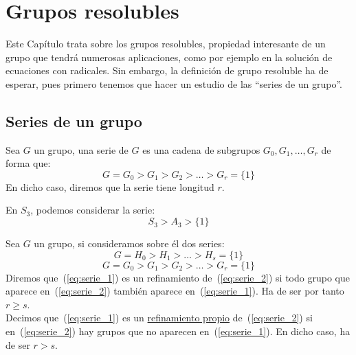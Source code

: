 \chapter{Grupos resolubles} %
Este Capítulo trata sobre los grupos resolubles, propiedad interesante de un grupo que tendrá numerosas aplicaciones, como por ejemplo en la solución de ecuaciones con radicales. Sin embargo, la definición de grupo resoluble ha de esperar, pues primero tenemos que hacer un estudio de las ``series de un grupo''.

\section{Series de un grupo}
\begin{definicion}
    Sea $G$ un grupo, una serie de $G$ es una cadena de subgrupos $G_0,G_1,\ldots, G_r$ de forma que:
    \begin{equation*}
        G = G_0 > G_1 > G_2 > \ldots > G_r = \{1\}
    \end{equation*}
    En dicho caso, diremos que la serie tiene longitud $r$.
\end{definicion}

\begin{ejemplo}
    En $S_3$, podemos considerar la serie:
    \begin{equation*}
        S_3 > A_3 > \{1\}
    \end{equation*}
\end{ejemplo}

\begin{definicion}[Refinamiento]
    Sea $G$ un grupo, si consideramos sobre él dos series:
    \begin{equation}\label{eq:serie_2}
        G = H_0 > H_1 > \ldots > H_s = \{1\}
    \end{equation}
    \begin{equation}\label{eq:serie_1}
        G = G_0 > G_1 > G_2 > \ldots > G_r = \{1\}
    \end{equation}
    Diremos que~(\ref{eq:serie_1}) es un refinamiento de~(\ref{eq:serie_2}) si todo grupo que aparece en~(\ref{eq:serie_2}) también aparece en~(\ref{eq:serie_1}). Ha de ser por tanto $r\geq s$.\\

    \noindent
    Decimos que~(\ref{eq:serie_1}) es un \underline{refinamiento propio} de~(\ref{eq:serie_2}) si en~(\ref{eq:serie_2}) hay grupos que no aparecen en~(\ref{eq:serie_1}). En dicho caso, ha de ser $r>s$.
\end{definicion}

